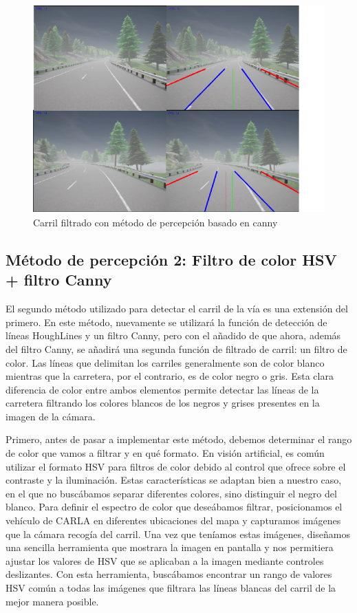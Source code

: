 \begin{figure} [t]
	\begin{center}
	\includegraphics[height=8cm]{imagenes/cap4/graphichs_canny/filtro_carril.pdf}
	\end{center}
	\caption[Carril filtrado con método canny]{Carril filtrado con método de percepción basado en canny}
	\label{fig:Carril filtrado con método canny}
\end{figure}

\newpage

\subsection{Método de percepción 2: Filtro de color HSV + filtro Canny}
\label{Método 2: Filtro de color HSV + filtro Canny}

El segundo método utilizado para detectar el carril de la vía es una extensión del primero. En este método, nuevamente se utilizará la función de detección de líneas HoughLines y un filtro Canny, pero con el añadido de que ahora, además del filtro Canny, se añadirá una segunda función de filtrado de carril: un filtro de color. Las líneas que delimitan los carriles generalmente son de color blanco mientras que la carretera, por el contrario, es de color negro o gris. Esta clara diferencia de color entre ambos elementos permite detectar las líneas de la carretera filtrando los colores blancos de los negros y grises presentes en la imagen de la cámara.

\bigskip

Primero, antes de pasar a implementar este método, debemos determinar el rango de color que vamos a filtrar y en qué formato. En visión artificial, es común utilizar el formato HSV para filtros de color debido al control que ofrece sobre el contraste y la iluminación. Estas características se adaptan bien a nuestro caso, en el que no buscábamos separar diferentes colores, sino distinguir el negro del blanco. Para definir el espectro de color que deseábamos filtrar, posicionamos el vehículo de CARLA en diferentes ubicaciones del mapa y capturamos imágenes que la cámara recogía del carril. Una vez que teníamos estas imágenes, diseñamos una sencilla herramienta que mostrara la imagen en pantalla y nos permitiera ajustar los valores de HSV que se aplicaban a la imagen mediante controles deslizantes. Con esta herramienta, buscábamos encontrar un rango de valores HSV común a todas las imágenes que filtrara las líneas blancas del carril de la mejor manera posible.

